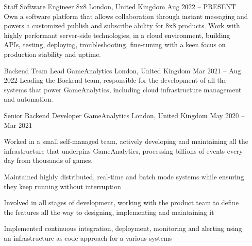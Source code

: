 

\begin{cventries}
  \cventry
    {Staff Software Engineer} %
    {8x8} %
    {London, United Kingdom} %
    {Aug 2022 – PRESENT} %
    {
      \responsibilities
        {Own a software platform that allows collaboration through instant
          messaging and powers a customized publish and subscribe ability for 8x8
          products. Work with highly performant server-side technologies, in a
          cloud environment, building APIs, testing, deploying, troubleshooting,
          fine-tuning with a keen focus on production stability and uptime.}
    }


  \cventry
    {Backend Team Lead} %
    {GameAnalytics} %
    {London, United Kingdom} %
    {Mar 2021 – Aug 2022} %
    {
      \responsibilities
        {Leading the Backend team, responsible for the development of all the
          systems that power GameAnalytics, including cloud infrastructure management and
          automation.}
    }

  \cventry
    {Senior Backend Developer} %
    {GameAnalytics} %
    {London, United Kingdom} %
    {May 2020 – Mar 2021} %
    {
      \responsibilities
        {Worked in a small self-managed team, actively developing and
        maintaining all the infrastructure that underpins GameAnalytics,
        processing billions of events every day from thousands of games.}
        \begin{cvitems} %
          \item {Maintained highly distributed, real-time and batch mode systems while ensuring they keep running without interruption}
          \item {Involved in all stages of development, working with the product team to
                 define the features all the way to designing, implementing and
                 maintaining it}
          \columnbreak
          \item {Implemented continuous integration, deployment, monitoring and
                 alerting using an infrastructure as code approach for a various
                 systems}
        \end{cvitems}
    }


\end{cventries}

